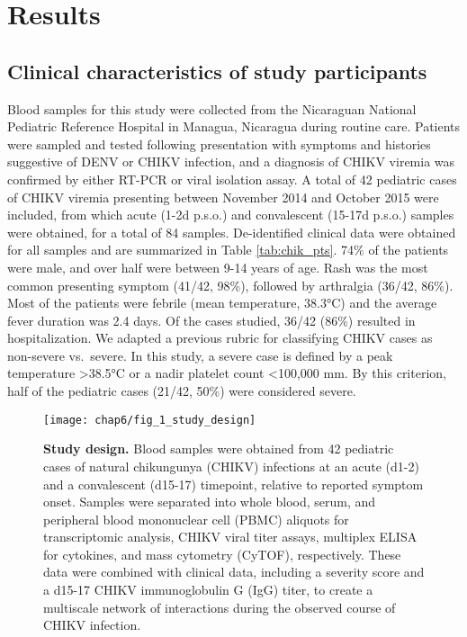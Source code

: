 \section{Results}

\subsection{Clinical characteristics of study participants}

Blood samples for this study were collected from the Nicaraguan National Pediatric Reference Hospital in Managua, Nicaragua during routine care. Patients were sampled and tested following presentation with symptoms and histories suggestive of DENV or CHIKV infection, and a diagnosis of CHIKV viremia was confirmed by either RT-PCR or viral isolation assay. A total of 42 pediatric cases of CHIKV viremia presenting between November 2014 and October 2015 were included, from which acute (1-2d p.s.o.) and convalescent (15-17d p.s.o.) samples were obtained, for a total of 84 samples.
De-identified clinical data were obtained for all samples and are summarized in Table \ref{tab:chik_pts}. 74\% of the patients were male, and over half were between 9-14 years of age. Rash was the most common presenting symptom (41/42, 98\%), followed by arthralgia (36/42, 86\%). Most of the patients were febrile (mean temperature, 38.3°C) and the average fever duration was 2.4 days. Of the cases studied, 36/42 (86\%) resulted in hospitalization. We adapted a previous rubric for classifying CHIKV cases as non-severe vs.\ severe.\autocite{Chow2011,Ng2009} In this study, a severe case is defined by a peak temperature >38.5°C or a nadir platelet count <100,000 mm. By this criterion, half of the pediatric cases (21/42, 50\%) were considered severe.

\begin{figure}[htb]
  \texttt{[image: chap6/fig\_1\_study\_design]}
  \caption[Study design]{\textbf{Study design.} Blood samples were obtained from 42 pediatric cases of natural chikungunya (CHIKV) infections at an acute (d1-2) and a convalescent (d15-17) timepoint, relative to reported symptom onset. Samples were separated into whole blood, serum, and peripheral blood mononuclear cell (PBMC) aliquots for transcriptomic analysis, CHIKV viral titer assays, multiplex ELISA for cytokines, and mass cytometry (CyTOF), respectively. These data were combined with clinical data, including a severity score and a d15-17 CHIKV immunoglobulin G (IgG) titer, to create a multiscale network of interactions during the observed course of CHIKV infection.
  }
  \label{fig:chik_study_design}
\end{figure}

